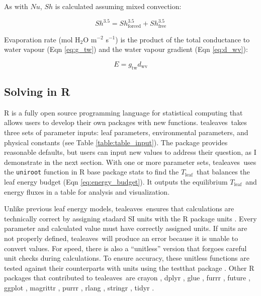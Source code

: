 \documentclass[11pt, oneside]{article}
\newcommand{\pkg}[1]{{\fontseries{b}\selectfont #1}}
\newcommand{\code}[1]{{\texttt{#1}}}
\newcommand{\tealeaves}{\pkg{tealeaves}}
\newcommand{\tleaf}{$T_\mathrm{leaf}$}
\begin{document}
As with $\mathit{Nu}$, $\mathit{Sh}$ is calculated assuming mixed convection:

\begin{equation}
  \label{eq:sherwood}
  \mathit{Sh} ^ {3.5} = \mathit{Sh}_\mathrm{forced} ^ {3.5} + \mathit{Sh}_\mathrm{free} ^ {3.5}
\end{equation}

Evaporation rate (mol H$_2$O m$^{-2}$ s$^{-1}$) is the product of the total conductance to water vapour (Eqn \ref{eq:g_tw}) and the water vapour gradient (Eqn \ref{eq:d_wv}):

\begin{equation}
  E = g_\mathrm{tw} d_\mathrm{wv}
\end{equation}

\subsection*{Solving in R}

R is a fully open source programming language for statistical computing that allows users to develop their own packages with new functions. \tealeaves~takes three sets of parameter inputs: leaf parameters, environmental parameters, and physical constants (see Table \ref{table:table_input}). The package provides reasonable defaults, but users can input new values to address their question, as I demonstrate in the next section. With one or more parameter sets, \tealeaves~uses the \code{uniroot} function in R base package \pkg{stats} to find the \tleaf~that balances the leaf energy budget (Eqn \ref{eq:energy_budget}). It outputs the equilibrium \tleaf~and energy fluxes in a table for analysis and visualization.

Unlike previous leaf energy models, \tealeaves~ensures that calculations are technically correct by assigning stadard SI units with the R package \pkg{units} \cite{Pebesma_etal_2016}. Every parameter and calculated value must have correctly assigned units. If units are not properly defined, \tealeaves~will produce an error because it is unable to convert values. For speed, there is also a ``unitless'' version that forgoes careful unit checks during calculations. To ensure accuracy, these unitless functions are tested against their counterparts with units using the \pkg{testthat} package \citep{Wickham_2011b}. Other R packages that contributed to \tealeaves~are \pkg{crayon} \citep{Csardi_2017}, \pkg{dplyr} \citep{Wickham_etal_2018}, \pkg{glue} \citep{Hester_2018}, \pkg{furrr} \citep{Vaughan_Dancho_2018}, \pkg{future} \citep{Bengtsson_2018}, \pkg{ggplot} \citep{Wickham_2016}, \pkg{magrittr} \citep{Bache_Wickham_2014}, \pkg{purrr} \citep{Henry_Wickham_2018b}, \pkg{rlang} \citep{Henry_Wickham_2018a}, \pkg{stringr} \citep{Wickham_2018}, \pkg{tidyr} \citep{Wickham_Henry_2018}.
\end{document}
